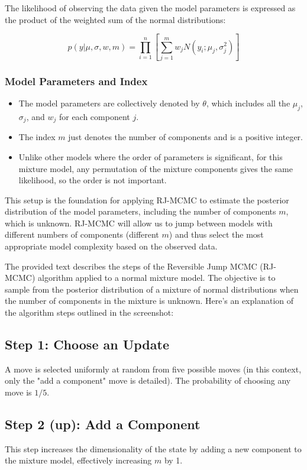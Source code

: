 \documentclass[10pt]{article}
\begin{document}
The likelihood of observing the data given the model parameters is expressed as the product of the weighted sum of the normal distributions:

\[ p(y|\mu, \sigma, w, m) = \prod_{i=1}^{n} \left[ \sum_{j=1}^{m} w_j N(y_i; \mu_j, \sigma_j^2) \right] \]

\subsubsection*{Model Parameters and Index}
\begin{itemize}
  \item The model parameters are collectively denoted by \( \theta \), which includes all the \( \mu_j \), \( \sigma_j \), and \( w_j \) for each component \( j \).
  \item The index \( m \) just denotes the number of components and is a positive integer.
  \item Unlike other models where the order of parameters is significant, for this mixture model, any permutation of the mixture components gives the same likelihood, so the order is not important.
\end{itemize}

This setup is the foundation for applying RJ-MCMC to estimate the posterior distribution of the model parameters, including the number of components \( m \), which is unknown. RJ-MCMC will allow us to jump between models with different numbers of components (different \( m \)) and thus select the most appropriate model complexity based on the observed data.

The provided text describes the steps of the Reversible Jump MCMC (RJ-MCMC) algorithm applied to a normal mixture model. The objective is to sample from the posterior distribution of a mixture of normal distributions when the number of components in the mixture is unknown. Here's an explanation of the algorithm steps outlined in the screenshot:

\subsection*{Step 1: Choose an Update}
A move is selected uniformly at random from five possible moves (in this context, only the "add a component" move is detailed). The probability of choosing any move is \(1/5\).

\subsection*{Step 2 (up): Add a Component}
This step increases the dimensionality of the state by adding a new component to the mixture model, effectively increasing \(m\) by 1.
\end{document}
